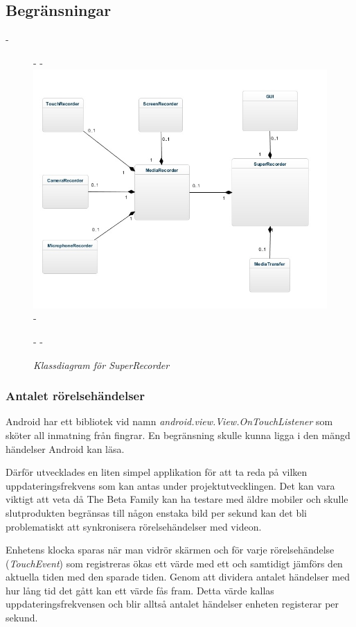 \subsection{Begränsningar}
\label{subsec:constraints}

-\begin{figure}[H]
 -\centering
 -\includegraphics[width=\textwidth,height=\textheight,keepaspectratio]{SuperRecorderClassDiagram-diag.jpg}
 -\caption*{\textit{Klassdiagram för SuperRecorder}}
 -\label{figure:class}
 -\end{figure}

\subsubsection{Antalet rörelsehändelser}
\label{touchevents}
Android har ett bibliotek vid namn \emph{android.view.View.OnTouchListener}\parencite{touchlistener} som sköter all inmatning från fingrar. En begränsning skulle kunna ligga i den mängd händelser Android kan läsa. 

Därför utvecklades en liten simpel applikation för att ta reda på vilken uppdateringsfrekvens som kan antas under projektutvecklingen. Det kan vara viktigt att veta då The Beta Family kan ha testare med äldre mobiler och skulle slutprodukten begränsas till någon enstaka bild per sekund kan det bli problematiskt att synkronisera rörelsehändelser med videon.

Enhetens klocka sparas när man vidrör skärmen och för varje rörelsehändelse (\emph{TouchEvent}) som registreras ökas ett värde med ett och samtidigt jämförs den aktuella tiden med den sparade tiden. Genom att dividera antalet händelser med hur lång tid det gått kan ett värde fås fram. Detta värde kallas uppdateringsfrekvensen och blir alltså antalet händelser enheten registerar per sekund.

